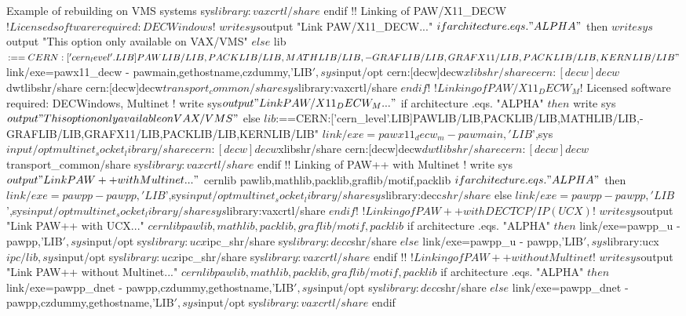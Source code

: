 \begin{XMPt}{Example of rebuilding \PAW{} on VMS systems}
             sys$library:vaxcrtl/share
$   endif
$!
$! Linking of PAW/X11_DECW
$! Licensed software required: DECWindows
$!
$   write sys$output "Link PAW/X11_DECW..."
$   if architecture .eqs. "ALPHA"
$      then
$         write sys$output "This option only available on VAX/VMS"
$      else
$         lib$:==CERN:['cern_level'.LIB]PAWLIB/LIB,PACKLIB/LIB,MATHLIB/LIB,-
GRAFLIB/LIB,GRAFX11/LIB,PACKLIB/LIB,KERNLIB/LIB"
$         link/exe=pawx11_decw -
             pawmain,gethostname,czdummy,'LIB$',sys$input/opt
             cern:[decw]decw$xlibshr/share
             cern:[decw]decw$dwtlibshr/share
             cern:[decw]decw$transport_common/share
             sys$library:vaxcrtl/share
$   endif
$!
$! Linking of PAW/X11_DECW_M
$! Licensed software required: DECWindows, Multinet
$!
$   write sys$output "Link PAW/X11_DECW_M..."
$   if architecture .eqs. "ALPHA"
$      then
$         write sys$output "This option only available on VAX/VMS"
$      else
$         lib$:==CERN:['cern_level'.LIB]PAWLIB/LIB,PACKLIB/LIB,MATHLIB/LIB,-
GRAFLIB/LIB,GRAFX11/LIB,PACKLIB/LIB,KERNLIB/LIB"
$         link/exe=pawx11_decw_m -
             pawmain,'LIB$',sys$input/opt
             multinet_socket_library/share
             cern:[decw]decw$xlibshr/share
             cern:[decw]decw$dwtlibshr/share
             cern:[decw]decw$transport_common/share
             sys$library:vaxcrtl/share
$   endif
$!
$! Linking of PAW++ with Multinet
$!
$   write sys$output "Link PAW++ with Multinet..."
$   cernlib pawlib,mathlib,packlib,graflib/motif,packlib
$   if architecture .eqs. "ALPHA"
$      then
$         link/exe=pawpp -
             pawpp,'LIB$',sys$input/opt
             multinet_socket_library/share
             sys$library:decc$shr/share
$      else
$         link/exe=pawpp -
             pawpp,'LIB$',sys$input/opt
             multinet_socket_library/share
             sys$library:vaxcrtl/share
$   endif
$!
$! Linking of PAW++ with DEC TCP/IP (UCX)
$!
$   write sys$output "Link PAW++ with UCX..."
$   cernlib pawlib,mathlib,packlib,graflib/motif,packlib
$   if architecture .eqs. "ALPHA"
$      then
$         link/exe=pawpp_u -
             pawpp,'LIB$',sys$input/opt
             sys$library:ucx$ipc_shr/share
             sys$library:decc$shr/share
$      else
$         link/exe=pawpp_u -
             pawpp,'LIB$',sys$library:ucx$ipc/lib,sys$input/opt
             sys$library:ucx$ipc_shr/share
             sys$library:vaxcrtl/share
$   endif
$!
$!
$! Linking of PAW++ without Multinet
$!
$   write sys$output "Link PAW++ without Multinet..."
$   cernlib pawlib,mathlib,packlib,graflib/motif,packlib
$   if architecture .eqs. "ALPHA"
$      then
$         link/exe=pawpp_dnet -
             pawpp,czdummy,gethostname,'LIB$',sys$input/opt
             sys$library:decc$shr/share
$      else
$         link/exe=pawpp_dnet -
             pawpp,czdummy,gethostname,'LIB$',sys$input/opt
             sys$library:vaxcrtl/share
$   endif
\end{XMPt}

